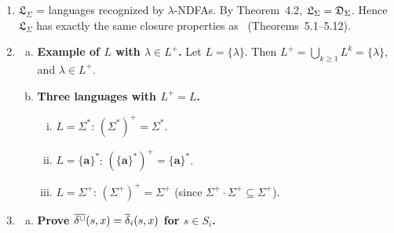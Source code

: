 \begin{enumerate}[{5.}1. ]
\begin{enumerate}[(a)]
  \item \textbf{By theorems.}  $L_1\setminus L_2=L_1\cap\sim L_2$.  Since \DSIG\ is closed under complement (Theorem~5.1) and intersection (Lemma~5.1), $L_1\setminus L_2\in\DSIG$.

  \item \textbf{Machine definition.}  Define $A^-$ as the product of $A_1$ and $A_2^\sim$ (complement of $A_2$), using the intersection machine from Lemma~5.1 with $F^-=F_1\times(S_2\setminus F_2)$.

  \item \textbf{Proof.}  By induction (as in Exercise~5.56/5.57), $\overline{\delta^-}(\langle s^1_0,s^2_0\rangle,x)=\langle\deltabar{1}(s^1_0,x),\deltabar{2}(s^2_0,x)\rangle$.  Then $x\in L(A^-)$ iff $\deltabar{1}(s^1_0,x)\in F_1$ and $\deltabar{2}(s^2_0,x)\notin F_2$ iff $x\in L_1\setminus L_2$. \qed
\end{enumerate}

\item $\mathfrak{L}_\Sigma$ = languages recognized by $\lambda$-NDFAs.  By Theorem~4.2, $\mathfrak{L}_\Sigma=\mathfrak{D}_\Sigma$.  Hence $\mathfrak{L}_\Sigma$ has exactly the same closure properties as \DSIG\ (Theorems~5.1--5.12).

\item \begin{enumerate}[(a)]
  \item \textbf{Example of $L$ with $\lambda\in L^+$.}  Let $L=\{\lambda\}$.  Then $L^+=\bigcup_{k\ge 1}L^k=\{\lambda\}$, and $\lambda\in L^+$.

  \item \textbf{Three languages with $L^+=L$.}
  \begin{enumerate}[(i)]
    \item $L=\Sigma^*$: $(\Sigma^*)^+=\Sigma^*$.
    \item $L=\{\pmb{a}\}^*$: $(\{\pmb{a}\}^*)^+=\{\pmb{a}\}^*$.
    \item $L=\Sigma^+$: $(\Sigma^+)^+=\Sigma^+$ (since $\Sigma^+\cdot\Sigma^+\subseteq\Sigma^+$).
  \end{enumerate}
\end{enumerate}

\item \begin{enumerate}[(a)]
  \item \textbf{Prove $\overline{\delta^\cup}(s,x)=\overline{\delta}_i(s,x)$ for $s\in S_i$.}


\end{enumerate}
\end{enumerate}
